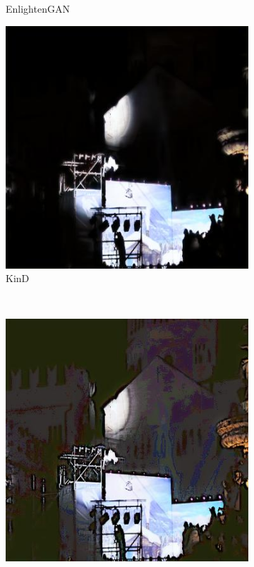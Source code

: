 \documentclass[a4paper]{ctexart}
\begin{document}
\begin{figure}[htb]
\begin{subfigure}{0.19\textwidth}
				\captionsetup{font=scriptsize}
				\caption{EnlightenGAN}
				\label{fig: EnlightenGAN2}
			\end{subfigure}
			\begin{subfigure}{0.19\textwidth}
				\includegraphics[width=\linewidth]{picture/LLIE/Experiment/KinD2}
				\captionsetup{font=scriptsize}
				\caption{KinD}
				\label{fig: KinD2}
			\end{subfigure}\\
			\begin{subfigure}{0.19\textwidth}
				\includegraphics[width=\linewidth]{picture/LLIE/Experiment/Retinex-Net2}

\end{subfigure}
\end{figure}
\end{document}
